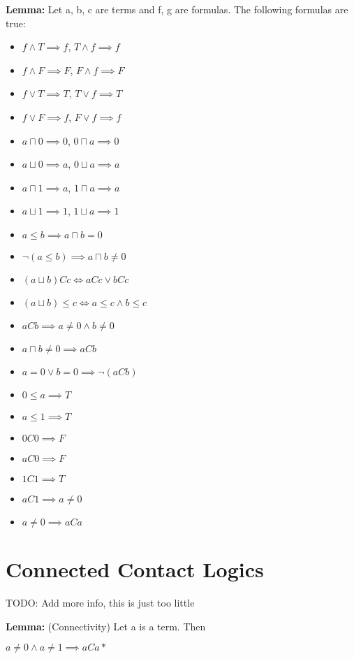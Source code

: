 \documentclass{article}
\newcommand\Lemma{\noindent \textbf{Lemma: }}
\begin{document}
	\par
	\Lemma Let a, b, c are terms and f, g are formulas. The following formulas are true:
	\begin{itemize}
		\item $f \land T \implies f$, $T \land f \implies f$
		\item $f \land F \implies F$, $F \land f \implies F$
		\item $f \lor T \implies T$, $T \lor f \implies T$
		\item $f \lor F \implies f$, $F \lor f \implies f$
		\item $a \sqcap 0 \implies 0$, $0 \sqcap a \implies 0$
		\item $a \sqcup 0 \implies a$, $0 \sqcup a \implies a$
		\item $a \sqcap 1 \implies a$, $1 \sqcap a \implies a$
		\item $a \sqcup 1 \implies 1$, $1 \sqcup a \implies 1$
		\item $a \leq b \implies a \sqcap b = 0$
		\item $\neg(a \leq b) \implies a \sqcap b \neq 0$
		\item $(a \sqcup b)Cc \iff aCc \lor bCc$
		\item $(a \sqcup b) \leq c \iff a \leq c \land b \leq c$
		\item $aCb \implies a \neq 0 \land b \neq 0$
		\item $a \sqcap b \neq 0 \implies aCb$
		\item $a = 0 \lor b = 0 \implies \neg(aCb)$
		\item $0 \leq a \implies T$
		\item $a \leq 1 \implies T$
		\item $0C0 \implies F$
		\item $aC0 \implies F$
		\item $1C1 \implies T$
		\item $aC1 \implies a \neq 0$
		\item $a \neq 0 \implies aCa$

	\end{itemize}

	\newpage
	\section{Connected Contact Logics}
	TODO: Add more info, this is just too little

	\par
	\Lemma (Connectivity) Let a is a term. Then \par $a \neq 0 \land a \neq 1 \implies aCa*$
\end{document}
